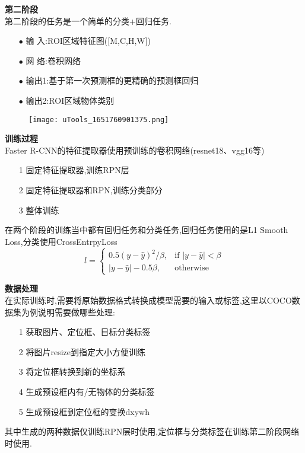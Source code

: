 \begin{frame}
    \vspace{0.5em}
    \noindent\large\textbf{第二阶段}\\
    \vspace{0.5em}
    第二阶段的任务是一个简单的分类+回归任务.
    \begin{itemize}
        \item[$ \bullet $]输 入:ROI区域特征图([M,C,H,W])
        \item[$ \bullet $]网 络:卷积网络
        \item[$ \bullet $]输出1:基于第一次预测框的更精确的预测框回归
        \item[$ \bullet $]输出2:ROI区域物体类别
    \end{itemize}
    \begin{figure}
        \texttt{[image: uTools\_1651760901375.png]}
    \end{figure}
\end{frame}

\begin{frame}
    \vspace{0.5em}
    \noindent\large\textbf{训练过程}\\
    \vspace{0.5em}
    Faster R-CNN的特征提取器使用预训练的卷积网络(resnet18、vgg16等)
    \begin{itemize}
        \item[1]固定特征提取器,训练RPN层
        \item[2]固定特征提取器和RPN,训练分类部分
        \item[3]整体训练
    \end{itemize}
    在两个阶段的训练当中都有回归任务和分类任务,回归任务使用的是L1 Smooth Loss,分类使用CrossEntrpyLoss
    $$
        l = \begin{cases}
            0.5 (y - \hat{y})^2 / \beta, & \text{if } |y - \hat{y}| < \beta \\
            |y - \hat{y}| - 0.5 \beta,   & \text{otherwise }
        \end{cases}
    $$


\end{frame}

\begin{frame}
    \vspace{0.5em}
    \noindent\large\textbf{数据处理}\\
    \vspace{0.5em}
    在实际训练时,需要将原始数据格式转换成模型需要的输入或标签,这里以COCO数据集为例说明需要做哪些处理:
    \begin{itemize}
        \item[1]获取图片、定位框、目标分类标签
        \item[2]将图片resize到指定大小方便训练
        \item[3]将定位框转换到新的坐标系
        \item[4]生成预设框内有/无物体的分类标签
        \item[5]生成预设框到定位框的变换dxywh
    \end{itemize}
    其中生成的两种数据仅训练RPN层时使用,定位框与分类标签在训练第二阶段网络时使用.
\end{frame}

